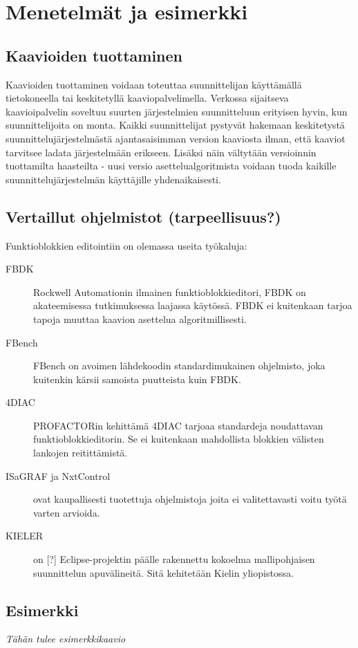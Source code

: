 \documentclass[finnish,12pt]{article}
\begin{document}
	\section{Menetelmät ja esimerkki}

		\subsection{Kaavioiden tuottaminen}

Kaavioiden tuottaminen voidaan toteuttaa suunnittelijan käyttämällä tietokoneella tai keskitetyllä kaaviopalvelimella.
Verkossa sijaitseva kaavioipalvelin soveltuu suurten järjestelmien suunnitteluun erityisen hyvin, kun suunnittelijoita on monta. Kaikki suunnittelijat pystyvät hakemaan keskitetystä suunnittelujärjestelmästä ajantasaisimman version kaaviosta ilman, että kaaviot tarvitsee ladata järjestelmään erikseen.
Lisäksi näin vältytään versioinnin tuottamilta haasteilta - uusi versio asettelualgoritmista voidaan tuoda kaikille suunnittelujärjestelmän käyttäjille yhdenaikaisesti.

		\subsection{Vertaillut ohjelmistot (tarpeellisuus?) }

Funktioblokkien editointiin on olemassa useita työkaluja:

\begin{description}
	\item[FBDK] Rockwell Automationin ilmainen funktioblokkieditori, FBDK on akateemisessa tutkimuksessa laajassa käytössä. FBDK ei kuitenkaan tarjoa tapoja muuttaa kaavion asettelua algoritmillisesti.
	\item[FBench] FBench on avoimen lähdekoodin standardimukainen ohjelmisto, joka kuitenkin kärsii samoista puutteista kuin FBDK.
	\item[4DIAC] PROFACTORin kehittämä 4DIAC tarjoaa standardeja noudattavan funktioblokkieditorin. Se ei kuitenkaan mahdollista blokkien välisten lankojen reitittämistä. 
	\item[ISaGRAF ja NxtControl] ovat kaupallisesti tuotettuja ohjelmistoja joita ei valitettavasti voitu työtä varten arvioida.
	\item[KIELER] on [?] Eclipse-projektin päälle rakennettu kokoelma mallipohjaisen suunnittelun apuvälineitä. Sitä kehitetään Kielin yliopistossa.
\end{description}

		\subsection{Esimerkki}
			\emph{Tähän tulee esimerkkikaavio}
\end{document}
